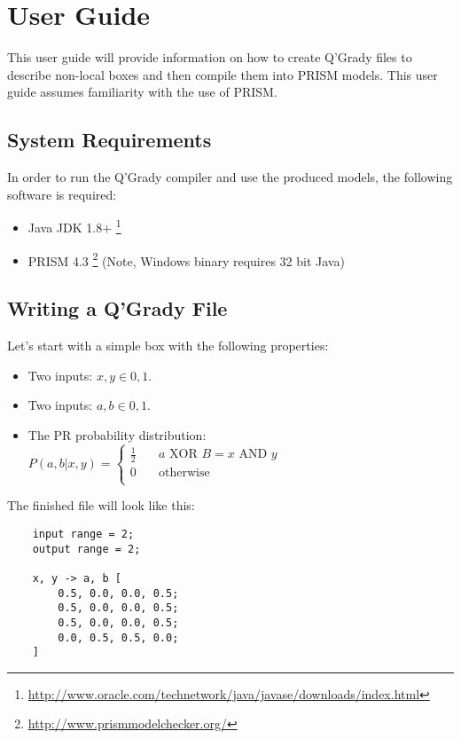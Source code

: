 \documentclass[report.tex]{subfiles}
\begin{document}
\chapter{User Guide} %
\label{cha:user_guide}
This user guide will provide information on how to create Q'Grady files to
describe non-local boxes and then compile them into PRISM models. This user
guide assumes familiarity with the use of PRISM.

\section{System Requirements} %
\label{sec:system_requirements}
In order to run the Q'Grady compiler and use the produced models, the following
software is required:

\begin{itemize}
    \item Java JDK 1.8+ \footnote{\url{http://www.oracle.com/technetwork/java/javase/downloads/index.html}}
    \item PRISM 4.3 \footnote{\url{http://www.prismmodelchecker.org/}} (Note, Windows binary requires 32 bit Java)
\end{itemize}

\section{Writing a Q'Grady File} %
\label{sec:writing_a_q_grady_file}
Let's start with a simple box with the following properties:
\begin{itemize}
    \item Two inputs: \(x, y \in {0, 1}\).
    \item Two inputs: \(a, b \in {0, 1}\).
    \item The PR probability distribution:
    \(
        P(a, b | x, y) = 
        \begin{cases}
            \frac{1}{2} & \quad a \text{ XOR } B = x \text{ AND } y \\
            0 & \quad \text{otherwise} \\
        \end{cases}
    \)
\end{itemize}

The finished file will look like this:

\begin{lstlisting}
    input range = 2;
    output range = 2;

    x, y -> a, b [
        0.5, 0.0, 0.0, 0.5;
        0.5, 0.0, 0.0, 0.5;
        0.5, 0.0, 0.0, 0.5;
        0.0, 0.5, 0.5, 0.0;
    ]
\end{lstlisting}
\end{document}
